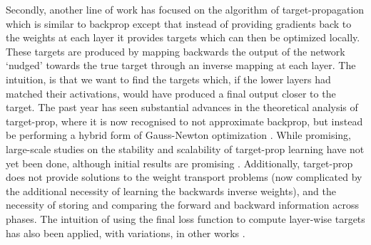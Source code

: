 Secondly, another line of work has focused on the algorithm of target-propagation \citep{bengio2015early,lee2015difference} which is similar to backprop except that instead of providing gradients back to the weights at each layer it provides targets which can then be optimized locally. These targets are produced by mapping backwards the output of the network `nudged' towards the true target through an inverse mapping at each layer. The intuition, is that we want to find the targets which, if the lower layers had matched their activations, would have produced a final output closer to the target. The past year has seen substantial advances in the theoretical analysis of target-prop, where it is now recognised to not approximate backprop, but instead be performing a hybrid form of Gauss-Newton optimization \citep{bengio2020deriving,meulemans2020theoretical}. While promising, large-scale studies on the stability and scalability of target-prop learning have not yet been done, although initial results are promising \citep{bartunov2018assessing}. Additionally, target-prop does not provide solutions to the weight transport problems (now complicated by the additional necessity of learning the backwards inverse weights), and the necessity of storing and comparing the forward and backward information across phases. The intuition of using the final loss function to compute layer-wise targets has also been applied, with variations, in other works \citep{ororbia2019biologically,ororbia2017learning,kaiser2020synaptic}.

